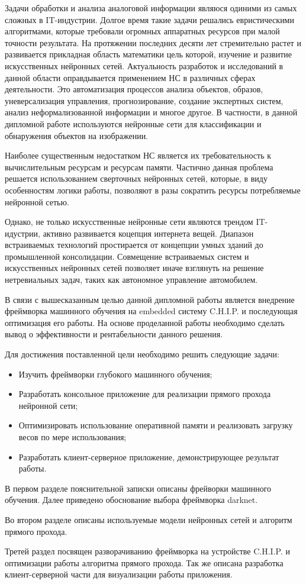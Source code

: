 \documentclass[a4paper,english,russian]{G2-105}
\begin{document}
 \ttl
\par Задачи обработки и анализа аналоговой информации являюся одиними из самых сложных в IT-индустрии. Долгое
время такие задачи решались евристическими алгоритмами, которые требовали огромных аппаратных ресурсов при малой точности результата. На протяжении последних десяти лет стремительно растет и развивается прикладная область математики цель которой, изучение и развитие искусственных нейронных сетей. Актуальность разработок и исследований в данной области оправдывается применением НС в различных сферах деятельности. Это автоматизация процессов анализа объектов, образов, уневерсализация управления, прогнозирование, создание экспертных систем, анализ неформализованной информации и многое другое. В частности, в данной дипломной работе используются нейронные сети для классификации и обнаружения объектов на изображении. 
\par Наиболее существенным недостатком НС является их требовательность к вычислительным ресурсам и ресурсам памяти. Частично данная проблема решается использованием сверточных нейронных сетей, которые, в виду особенностям логики работы, позволяют в разы сократить ресурсы потребляемые нейронной сетью.
\par Однако, не только искусственные нейронные сети являются трендом IT-идустрии, активно развивается коцепция интернета вещей. Диапазон встраиваемых технологий простирается от концепции умных зданий до промышленной консолидации. Совмещение встраиваемых систем и искусственных нейронных сетей позволяет иначе взглянуть на решение нетревиальных задач, таких как автономное управление автомобилем.
\par В связи с вышесказанным целью данной дипломной работы является внедрение фреймворка машинного обучения на embedded систему C.H.I.P. и последующая оптимизация его работы. На основе проделанной работы необходимо сделать вывод о эффективности и рентабельности данного решения. 
\par Для достижения поставленной цели необходимо решить следующие задачи:
\begin{itemize}
\item Изучить фреймворки глубокого машинного обучения;
\item Разработать консольное приложение для реализации прямого прохода нейронной сети;
\item Оптимизировать использование оперативной памяти и реализовать загрузку весов по мере использования;
\item Разработать клиент-серверное приложение, демонстрирующее результат работы.
\end{itemize}
\par В первом разделе пояснительной записки описаны фрейворки машинного обучения. Далее приведено обоснование выбора фреймворка darknet.
\par Во втором разделе описаны используемые модели нейронных сетей и алгоритм прямого прохода.
\par Третей раздел посвящен разворачиванию фреймворка на устройстве C.H.I.P. и оптимизации работы алгоритма прямого прохода. Так же описана разработка клиент-серверной части для визуализации работы приложения. 
\newpage
\end{document}
